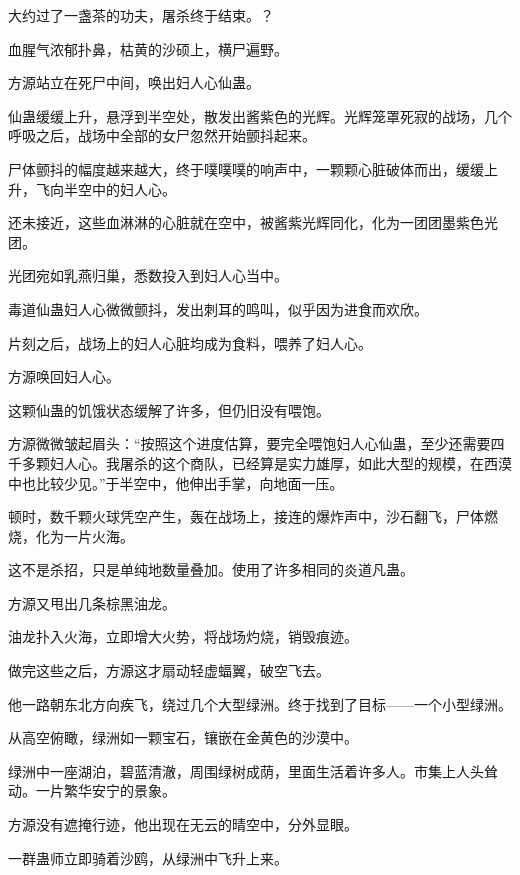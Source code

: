 
\begin{this_body}



大约过了一盏茶的功夫，屠杀终于结束。？

血腥气浓郁扑鼻，枯黄的沙硕上，横尸遍野。

方源站立在死尸中间，唤出妇人心仙蛊。

仙蛊缓缓上升，悬浮到半空处，散发出酱紫色的光辉。光辉笼罩死寂的战场，几个呼吸之后，战场中全部的女尸忽然开始颤抖起来。

尸体颤抖的幅度越来越大，终于噗噗噗的响声中，一颗颗心脏破体而出，缓缓上升，飞向半空中的妇人心。

还未接近，这些血淋淋的心脏就在空中，被酱紫光辉同化，化为一团团墨紫色光团。

光团宛如乳燕归巢，悉数投入到妇人心当中。

毒道仙蛊妇人心微微颤抖，发出刺耳的鸣叫，似乎因为进食而欢欣。

片刻之后，战场上的妇人心脏均成为食料，喂养了妇人心。

方源唤回妇人心。

这颗仙蛊的饥饿状态缓解了许多，但仍旧没有喂饱。

方源微微皱起眉头：“按照这个进度估算，要完全喂饱妇人心仙蛊，至少还需要四千多颗妇人心。我屠杀的这个商队，已经算是实力雄厚，如此大型的规模，在西漠中也比较少见。”于半空中，他伸出手掌，向地面一压。

顿时，数千颗火球凭空产生，轰在战场上，接连的爆炸声中，沙石翻飞，尸体燃烧，化为一片火海。

这不是杀招，只是单纯地数量叠加。使用了许多相同的炎道凡蛊。

方源又甩出几条棕黑油龙。

油龙扑入火海，立即增大火势，将战场灼烧，销毁痕迹。

做完这些之后，方源这才扇动轻虚蝠翼，破空飞去。

他一路朝东北方向疾飞，绕过几个大型绿洲。终于找到了目标——一个小型绿洲。

从高空俯瞰，绿洲如一颗宝石，镶嵌在金黄色的沙漠中。

绿洲中一座湖泊，碧蓝清澈，周围绿树成荫，里面生活着许多人。市集上人头耸动。一片繁华安宁的景象。

方源没有遮掩行迹，他出现在无云的晴空中，分外显眼。

一群蛊师立即骑着沙鸥，从绿洲中飞升上来。


\end{this_body}
